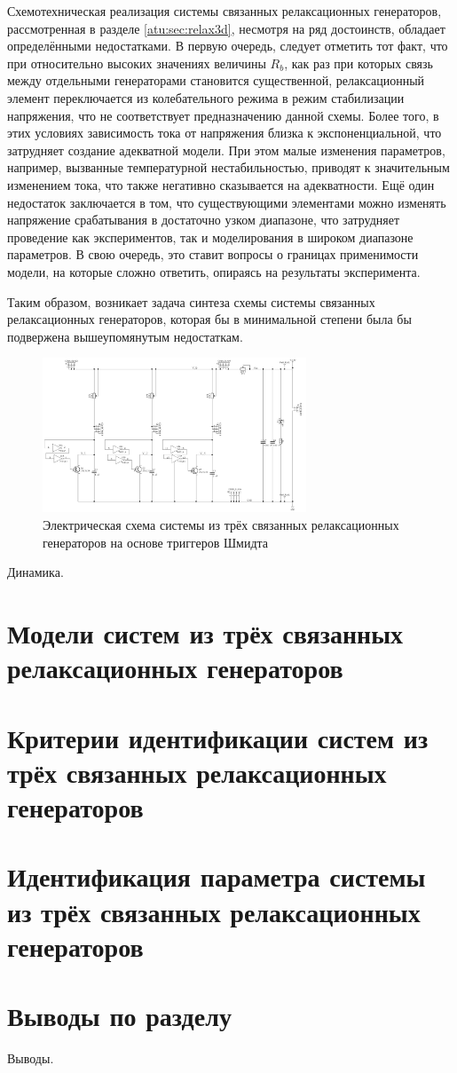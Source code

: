 Схемотехническая реализация системы связанных релаксационных генераторов,
рассмотренная в разделе \ref{atu:sec:relax3d}, несмотря на ряд достоинств,
обладает определёнными недостатками. В первую очередь, следует отметить
тот факт, что при относительно высоких значениях величины $R_b$,
как раз при которых связь между отдельными генераторами становится существенной,
релаксационный элемент переключается из колебательного режима в режим
стабилизации напряжения, что не соответствует предназначению данной схемы.
Более того, в этих условиях зависимость тока от напряжения близка к экспоненциальной,
что затрудняет создание адекватной модели. При этом малые изменения параметров,
например, вызванные температурной нестабильностью, приводят к значительным изменением
тока, что также негативно сказывается на адекватности. Ещё один недостаток
заключается в том, что существующими элементами можно изменять напряжение срабатывания
в достаточно узком диапазоне, что затрудняет проведение как экспериментов,
так и моделирования в широком диапазоне параметров. В свою очередь,
это ставит вопросы о границах применимости модели, на которые сложно
ответить, опираясь на результаты эксперимента.

Таким образом, возникает задача синтеза схемы системы связанных
релаксационных генераторов, которая бы в минимальной степени была бы
подвержена вышеупомянутым недостаткам.



\begin{figure}[htb!]
  \centerline{\includegraphics[width=0.7\textwidth]{p/relax3ds_schem.png} }
  \caption{Электрическая схема системы из трёх связанных релаксационных генераторов на основе триггеров Шмидта}
  \label{atu:relax3ds_schem}
\end{figure}


Динамика.

\section{Модели систем из трёх связанных релаксационных генераторов}


\section{Критерии идентификации систем из трёх связанных релаксационных генераторов}

\section{Идентификация параметра системы из трёх связанных релаксационных генераторов}

\section{Выводы по разделу \thechapter}

Выводы.

